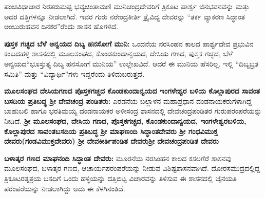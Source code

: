 \vskip 3pt

ಪಂಚವಿಧಾಚಾರ ನಿರತರುಮಪ್ಪ ಭವ್ಯಚಿಂತಾಮಣಿ ಮುನಿಚಂದ್ರದೇವರಿಗೆ ತ್ರಿಕೂಟ ಪಾರ್ಶ್ವ ಜಿನಭವನವನ್ನು ಮತ್ತು ಅದರ ದತ್ತಿಗಳನ್ನೂ ನೀಡಲಾಗಿದೆ. ಇವರ ಗುರು ನರೇಂದ್ರಕೀರ್ತಿ ತ್ರೈವಿದ್ಯ ದೇವರನ್ನು “ತರ್ಕ ವ್ಯಾಕರಣ ಸಿದ್ಧಾಂತ ಅಂಬುರುಹವನ ದಿನಕರ”ರೆಂದು ಶಾಸನ ಹೊಗಳಿದೆ.

\vskip 3pt

\textbf{ಪುಸ್ತಕ ಗಚ್ಛದ ಬೆಳೆ ಅನ್ವಯದ ದಿಬ್ಯ ಹನಸೋಗೆ ಮುನಿ:} ಒಂದನೆಯ ನರಸಿಂಹನ ಕಾಲದ ಪಾರ್ಶ್ವದೇವ ಪ್ರಭು\-ವಿನ ಕಂಬದಹಳ್ಳಿ ಶಾಸನದಲ್ಲಿ ಮೂಲಸಂಘದ, ಕೊಂಡಕುಂದಾನ್ವಯದ, ದೇಸಿಯ ಗಣದ, ಪುಸ್ತಕ ಗಚ್ಛದ, ಬೆಳೆ ಅನ್ವಯದ\break “ಭೂಸ್ತುತ್ಯ ದಿಬ್ಯ ಹನಸೋಗೆ ಮುನಿಯ” ಉಲ್ಲೇಖವಿದೆ. ಆದರೆ ಈ ಮುನಿಯ ಹೆಸರಿಲ್ಲ. ಇಲ್ಲಿ “ದಿಬ್ಯಬ್ರತ ಸಮಿತಿ” ಮತ್ತು “ವಿದ್ಯಾರ್ಥಿ”ಗಳು ಇದ್ದರೆಂದು ತಿಳಿದುಬರುತ್ತದೆ.

\vskip 3pt

\textbf{ಮೂಲಸಂಘದ ದೇಸಿಯಗಣದ ಪೊಸ್ತಕಗಚ್ಚದ ಕೊಂಡಕುಂದಾನ್ವಯದ ಇಂಗಳೇಶ್ವರ ಬಳಿಯ ಕೊಲ್ಲಾಪುರದ ಸಾವಂತ ಬಸದಿಯ ಪ್ರತಿಬದ್ಧ ಶ‍್ರೀ ದೇವಚಂದ್ರ ಪಂಡಿತರು: } ಎರಡನೆಯ ಬಲ್ಲಾಳನ ಮಹಾಪ್ರಧಾನ ದಂಡನಾಯಕರುಗಳಾಗಿದ್ದ ಬಾಹುಬಲಿ ಹಾಗೂ ಭರತಿಮಯ್ಯ ದಂಡನಾಯಕರ ಅಳೀಸಂದ್ರ ಶಾಸನದಲ್ಲಿ ದೇವಚಂದ್ರಪಂಡಿತರ ಗುರುಪರಂಪರೆಯನ್ನು ನೀಡಿದೆ. \textbf{ಶ‍್ರೀ ಮೂಲಸಂಘದ, ದೇಸಿಯ ಗಣದ, ಪೊಸ್ತಕಗಚ್ಛದ, ಕೊಂಡಕುಂದಾನ್ವಯದ, ಇಂಗಳೇಶ್ವರಬಳಿಯ, ಕೊಲ್ಲಾಪುರದ ಸಾವಂತಬಸದಿಯ ಪ್ರತಿಬದ್ಧ ಶ‍್ರೀ ಮಾಘಣಂದಿ ಸಿದ್ಧಾಂತದೇವರು \general{\enginline{-}} ಶ‍್ರೀ ಗಂಧವಿಮುಕ್ತ ದೇವರು\general{\break }(ಗಂಡವಿಮುಕ್ತದೇವರು) \general{\enginline{-}} ಶ‍್ರೀ ದೇವಕೀರ್ತಿಪಂಡಿತ ದೇವರು\general{\enginline{-}}ಶ‍್ರೀ ದೇವಚಂದ್ರಪಂಡಿತ ದೇವರು}

\vskip 3pt

\textbf{ಬಳಾತ್ಕರ ಗಣದ ಮಾಘನಂದಿ ಸಿದ್ಧಾಂತ ದೇವರು:} ಮೂರನೆಯ ನರಸಿಂಹನ ಕಾಲದ ಕಸಲಗೆರೆ ಶಾಸನವು ಮೂಲಸಂಘದ, ಬಳಾತ್ಕರ ಗಣದ, ಆಚಾರ್ಯಪರಂಪರೆಯನ್ನು ನೀಡುವ ವಿಶಿಷ್ಟಶಾಸನವಾಗಿದೆ. ದೋರಸಮುದ್ರದಲ್ಲಿದ್ದ ತ್ರಿಕೂಟರತ್ನತ್ರಯ ಬಸದಿಗೆ ಒಂದು ಹಳ್ಳಿಯನ್ನು ದತ್ತಿಬಿಟ್ಟ ವಿಚಾರವನ್ನು ತಿಳಿಸುವ ಈ ಶಾಸನದಲ್ಲಿ ಜೈನಯತಿ ಪರಂಪರೆಯನ್ನು ನೀಡಲಾಗಿದ್ದು ಅದು ಈ ಕೆಳಗಿನಂತಿದೆ.

\vskip 3pt

